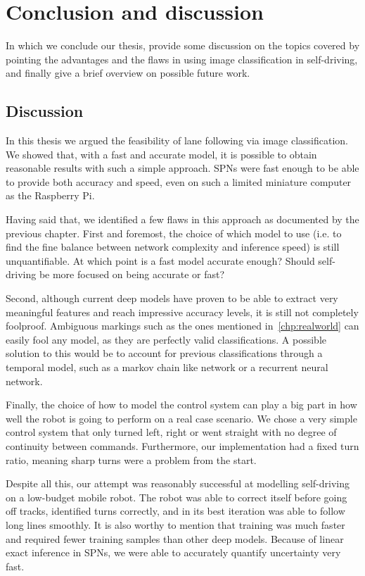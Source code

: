 
\chapter{Conclusion and discussion}\label{chp:conclusions}

In which we conclude our thesis, provide some discussion on the topics covered by pointing the
advantages and the flaws in using image classification in self-driving, and finally give a brief
overview on possible future work.

\section{Discussion}

In this thesis we argued the feasibility of lane following via image classification. We showed
that, with a fast and accurate model, it is possible to obtain reasonable results with such a
simple approach. SPNs were fast enough to be able to provide both accuracy and speed, even on such
a limited miniature computer as the Raspberry Pi.

Having said that, we identified a few flaws in this approach as documented by the previous chapter.
First and foremost, the choice of which model to use (i.e. to find the fine balance between network
complexity and inference speed) is still unquantifiable. At which point is a fast model accurate
enough? Should self-driving be more focused on being accurate or fast?

Second, although current deep models have proven to be able to extract very meaningful features and
reach impressive accuracy levels, it is still not completely foolproof. Ambiguous markings such as
the ones mentioned in~\autoref{chp:realworld} can easily fool any model, as they are perfectly
valid classifications. A possible solution to this would be to account for previous classifications
through a temporal model, such as a markov chain like network or a recurrent neural network.

Finally, the choice of how to model the control system can play a big part in how well the robot is
going to perform on a real case scenario. We chose a very simple control system that only turned
left, right or went straight with no degree of continuity between commands. Furthermore, our
implementation had a fixed turn ratio, meaning sharp turns were a problem from the start.

Despite all this, our attempt was reasonably successful at modelling self-driving on a low-budget
mobile robot. The robot was able to correct itself before going off tracks, identified turns
correctly, and in its best iteration was able to follow long lines smoothly. It is also worthy to
mention that training was much faster and required fewer training samples than other deep models.
Because of linear exact inference in SPNs, we were able to accurately quantify uncertainty very
fast.

